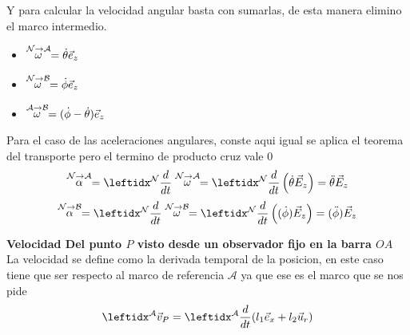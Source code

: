 \begin{tcolorbox}[title=Solucion sistema Doble varilla,breakable]
\begin{center}
\end{center}
Y para calcular la velocidad angular basta con sumarlas, de esta manera elimino el marco intermedio.
        \begin{itemize}
            \item $\stackrel{\mathcal{N} \to \mathcal{A}}{\omega}=\dot \theta\vec{e}_z$
            \item $\stackrel{\mathcal{N} \to \mathcal{B}}{\omega}=\dot \phi\vec{e}_z$
            \item $\stackrel{\mathcal{A} \to \mathcal{B}}{\omega}=(\dot \phi-\dot \theta)\vec{e}_z$
        \end{itemize}
Para el caso de las aceleraciones angulares, conste aqui igual se aplica el teorema del transporte pero el termino de producto cruz vale 0
        \begin{equation*}
            \accang{N}{A}=\der{}{N}\velang{N}{A}=\der{}{N}\left(\dot \theta\vec{E}_z\right)=\ddot \theta\vec{E}_z
        \end{equation*}
        \begin{equation*}
            \accang{N}{B}=\der{}{N}\velang{N}{B}=\der{}{N}\left((\dot \phi)\vec{E}_z\right)=(\ddot \phi)\vec{E}_z
        \end{equation*}

\textbf{Velocidad Del punto $P$ visto desde un observador fijo en la barra $OA$}\\
La velocidad se define como la derivada temporal de la posicion, en este caso tiene que ser respecto al marco de referencia $\mathcal{A}$ ya que ese es el marco que se nos pide
\begin{equation*}
            \marc{}{A}\vec{v}_P=\der{}{A}{(l_1\vec{e}_x+l_2\vec{u}_r)} 
        \end{equation*}



\end{tcolorbox}
